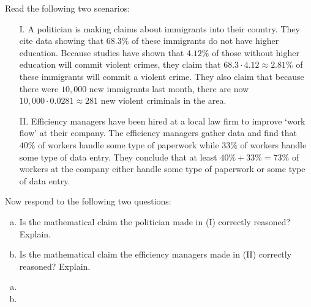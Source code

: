 \documentclass[12pt,letterpaper]{exam}
\begin{document}
\begin{questions}
\newpage
\question[10] Read the following two scenarios:
	\begin{enumerate}
	\item[I.] A politician is making claims about immigrants into their country. They cite data showing that $68.3\%$ of these immigrants do not have higher education. Because studies have shown that $4.12\%$ of those without higher education will commit violent crimes, they claim that $68.3 \cdot 4.12 \approx 2.81\%$ of these immigrants will commit a violent crime. They also claim that because there were $10,000$ new immigrants last month, there are now $10,\!000 \cdot 0.0281 \approx 281$ new violent criminals in the area.
	\item[II.] Efficiency managers have been hired at a local law firm to improve `work flow' at their company. The efficiency managers gather data and find that $40\%$ of workers handle some type of paperwork while $33\%$ of workers handle some type of data entry. They conclude that at least $40\% + 33\%= 73\%$ of workers at the company either handle some type of paperwork or some type of data entry. 
	\end{enumerate}
Now respond to the following two questions:

\begin{enumerate}[(a)]
\item Is the mathematical claim the politician made in (I) correctly reasoned? Explain.
\item Is the mathematical claim the efficiency managers made in (II) correctly reasoned? Explain.
\end{enumerate} \pspace

\sol 
{\itshape
\begin{enumerate}[(a)]
\item 
\item 
\end{enumerate}
}















\end{questions}
\end{document}
